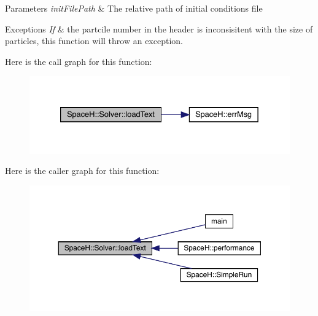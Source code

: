 \begin{DoxyParams}{Parameters}
{\em init\+File\+Path} & The relative path of initial conditions file \\
\hline
\end{DoxyParams}

\begin{DoxyExceptions}{Exceptions}
{\em If} & the partcile number in the header is inconsisitent with the size of particles, this function will throw an exception. \\
\hline
\end{DoxyExceptions}
Here is the call graph for this function\+:
\nopagebreak
\begin{figure}[H]
\begin{center}
\leavevmode
\includegraphics[width=333pt]{class_space_h_1_1_solver_aca3536accc3ff7f048f546992984d92a_cgraph}
\end{center}
\end{figure}
Here is the caller graph for this function\+:
\nopagebreak
\begin{figure}[H]
\begin{center}
\leavevmode
\includegraphics[width=350pt]{class_space_h_1_1_solver_aca3536accc3ff7f048f546992984d92a_icgraph}
\end{center}
\end{figure}
\mbox{\label{class_space_h_1_1_solver_ad52921ef312d63c82adf7f2fb98205aa}} 
